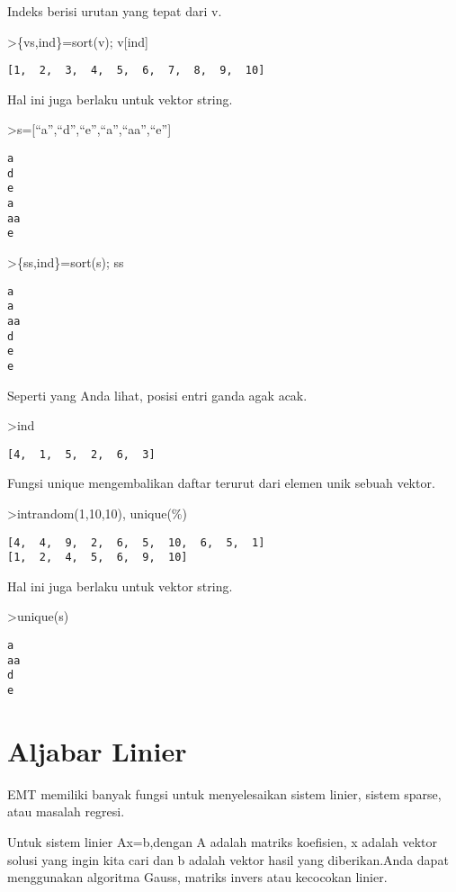 \documentclass[
]{book}
\begin{document}
Indeks berisi urutan yang tepat dari v.

\textgreater\{vs,ind\}=sort(v); v{[}ind{]}

\begin{verbatim}
[1,  2,  3,  4,  5,  6,  7,  8,  9,  10]
\end{verbatim}

Hal ini juga berlaku untuk vektor string.

\textgreater s={[}``a'',``d'',``e'',``a'',``aa'',``e''{]}

\begin{verbatim}
a
d
e
a
aa
e
\end{verbatim}

\textgreater\{ss,ind\}=sort(s); ss

\begin{verbatim}
a
a
aa
d
e
e
\end{verbatim}

Seperti yang Anda lihat, posisi entri ganda agak acak.

\textgreater ind

\begin{verbatim}
[4,  1,  5,  2,  6,  3]
\end{verbatim}

Fungsi unique mengembalikan daftar terurut dari elemen unik sebuah vektor.

\textgreater intrandom(1,10,10), unique(\%)

\begin{verbatim}
[4,  4,  9,  2,  6,  5,  10,  6,  5,  1]
[1,  2,  4,  5,  6,  9,  10]
\end{verbatim}

Hal ini juga berlaku untuk vektor string.

\textgreater unique(s)

\begin{verbatim}
a
aa
d
e
\end{verbatim}

\chapter{Aljabar Linier}\label{aljabar-linier}

EMT memiliki banyak fungsi untuk menyelesaikan sistem linier, sistem sparse, atau masalah regresi.

Untuk sistem linier Ax=b,dengan A adalah matriks koefisien, x adalah vektor solusi yang ingin kita cari dan b adalah vektor hasil yang diberikan.Anda dapat menggunakan algoritma Gauss, matriks invers atau kecocokan linier.
\end{document}
